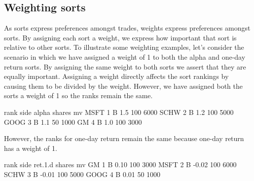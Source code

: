 \documentclass{article}
\begin{document}


\subsection{Weighting sorts}
\label{words weighting sorts}

As sorts express preferences amongst trades, weights express
preferences amongst sorts.  By assigning each sort a weight, we
express how important that sort is relative to other sorts.  To
illustrate some weighting examples, let's consider the scenario in
which we have assigned a weight of 1 to both the alpha and one-day
return sorts.  By assigning the same weight to both sorts we assert
that they are equally important.  Assigning a weight directly affects
the sort rankings by causing them to be divided by the weight.
However, we have assigned both the sorts a weight of 1 so the ranks
remain the same.

\begin{Schunk}
\begin{Soutput}
     rank side alpha shares   mv
MSFT    1    B   1.5    100 6000
SCHW    2    B   1.2    100 5000
GOOG    3    B   1.1     50 1000
GM      4    B   1.0    100 3000
\end{Soutput}
\end{Schunk}

However, the ranks for one-day return remain the same because one-day
return has a weight of 1.

\begin{Schunk}
\begin{Soutput}
     rank side ret.1.d shares   mv
GM      1    B    0.10    100 3000
MSFT    2    B   -0.02    100 6000
SCHW    3    B   -0.01    100 5000
GOOG    4    B    0.01     50 1000
\end{Soutput}
\end{Schunk}
\end{document}
